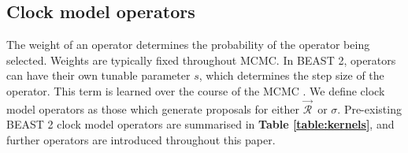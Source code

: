 \documentclass[10pt,letterpaper]{article}
\begin{document}
\clearpage
\subsection*{Clock model operators}
\label{sect:clockModelOperators}

The weight of an operator determines the probability of the operator being selected.
Weights are typically fixed throughout MCMC.
In BEAST 2, operators can have their own tunable parameter $s$, which determines the step size of the operator.
This term is learned over the course of the MCMC \cite{rosenthal2011optimal, bouckaert2019beast}. 
We define clock model operators as those which generate proposals for either $\vec{\mathcal{R}}^{\,}$ or $\sigma$.
Pre-existing BEAST 2 clock model operators are summarised in \textbf{Table \ref{table:kernels}}, and further operators are introduced throughout this paper.
\end{document}
